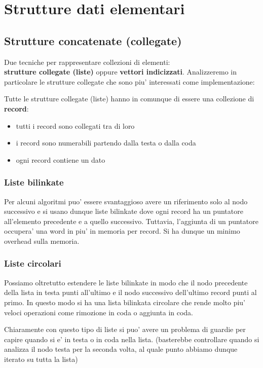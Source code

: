 \documentclass{article}
\begin{document}
\section{Strutture dati elementari}

\subsection{Strutture concatenate (collegate)}

Due tecniche per rappresentare collezioni di elementi: \\
\textbf{strutture collegate (liste)} oppure \textbf{vettori indicizzati}.
Analizzeremo in particolare le strutture collegate che sono piu' interessati come implementazione:

Tutte le strutture collegate (liste) hanno in comunque di essere una collezione di \textbf{record}:
\begin{itemize}
  \item tutti i record sono collegati tra di loro
  \item i record sono numerabili partendo dalla testa o dalla coda
  \item ogni record contiene un dato
\end{itemize}

\subsubsection{Liste bilinkate}

Per alcuni algoritmi puo' essere svantaggioso avere un riferimento solo al nodo successivo
e si usano dunque liste bilinkate dove ogni record ha un puntatore all'elemento
precedente e a quello successivo. Tuttavia, l'aggiunta di un puntatore occupera' una
word in piu' in memoria per record. Si ha dunque un minimo overhead sulla memoria.

\subsubsection{Liste circolari}

Possiamo oltretutto estendere le liste bilinkate in modo che il nodo precedente
della lista in testa punti all'ultimo e il nodo successivo dell'ultimo record punti
al primo. In questo modo si ha una lista bilinkata circolare che rende molto piu'
veloci operazioni come rimozione in coda o aggiunta in coda.

Chiaramente con questo tipo di liste si puo' avere un problema di guardie per capire
quando si e' in testa o in coda nella lista. (basterebbe controllare quando si analizza
il nodo testa per la seconda volta, al quale punto abbiamo dunque iterato su tutta la lista)
\end{document}
